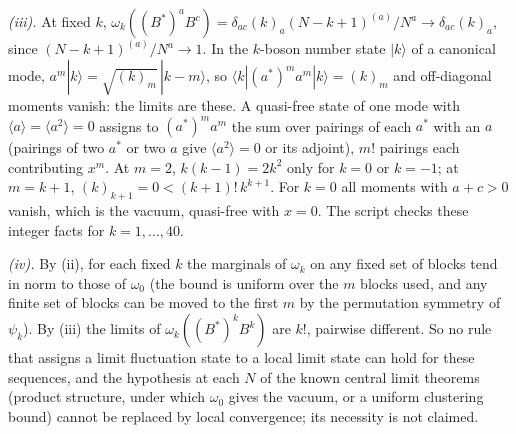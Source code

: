 \emph{(iii).} At fixed $k$, $\omega_{k}((B^{*})^{a}B^{c}) = \delta_{ac}(k)_{a}(N - k + 1)^{(a)}/N^{a} \to \delta_{ac}(k)_{a}$, since $(N - k + 1)^{(a)}/N^{a} \to 1$. In the $k$-boson number state $|k\rangle$ of a canonical mode, $a^{m}|k\rangle = \sqrt{(k)_{m}}\,|k - m\rangle$, so $\langle k|(a^{*})^{m}a^{m}|k\rangle = (k)_{m}$ and off-diagonal moments vanish: the limits are these. A quasi-free state of one mode with $\langle a\rangle = \langle a^{2}\rangle = 0$ assigns to $(a^{*})^{m}a^{m}$ the sum over pairings of each $a^{*}$ with an $a$ (pairings of two $a^{*}$ or two $a$ give $\langle a^{2}\rangle = 0$ or its adjoint), $m!$ pairings each contributing $x^{m}$. At $m = 2$, $k(k - 1) = 2k^{2}$ only for $k = 0$ or $k = -1$; at $m = k + 1$, $(k)_{k+1} = 0 < (k + 1)!\,k^{k+1}$. For $k = 0$ all moments with $a + c > 0$ vanish, which is the vacuum, quasi-free with $x = 0$. The script checks these integer facts for $k = 1, \dots, 40$.

\emph{(iv).} By (ii), for each fixed $k$ the marginals of $\omega_{k}$ on any fixed set of blocks tend in norm to those of $\omega_{0}$ (the bound is uniform over the $m$ blocks used, and any finite set of blocks can be moved to the first $m$ by the permutation symmetry of $\psi_{k}$). By (iii) the limits of $\omega_{k}((B^{*})^{k}B^{k})$ are $k!$, pairwise different. So no rule that assigns a limit fluctuation state to a local limit state can hold for these sequences, and the hypothesis at each $N$ of the known central limit theorems (product structure, under which $\omega_{0}$ gives the vacuum, or a uniform clustering bound) cannot be replaced by local convergence; its necessity is not claimed.

